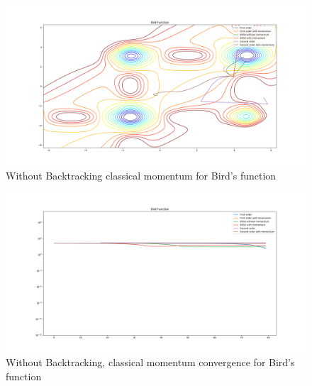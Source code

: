 \documentclass{article}
\begin{document}
\begin{center}
\begin{figure}[H]
	\includegraphics[width=\linewidth]{../Images/birdmomentum.png}
	\caption{Without Backtracking classical momentum for Bird's function}
	\label{fig:Without Backtracking classical momentum for Bird's function}
\end{figure}

\begin{figure}[H]
	\includegraphics[width=\linewidth]{../Images/birdmomentum1.png}
	\caption{Without Backtracking, classical momentum convergence for Bird's function}
	\label{fig:Without Backtracking, classical momentum convergence for Bird's function}
\end{figure}


\end{center}
\end{document}
